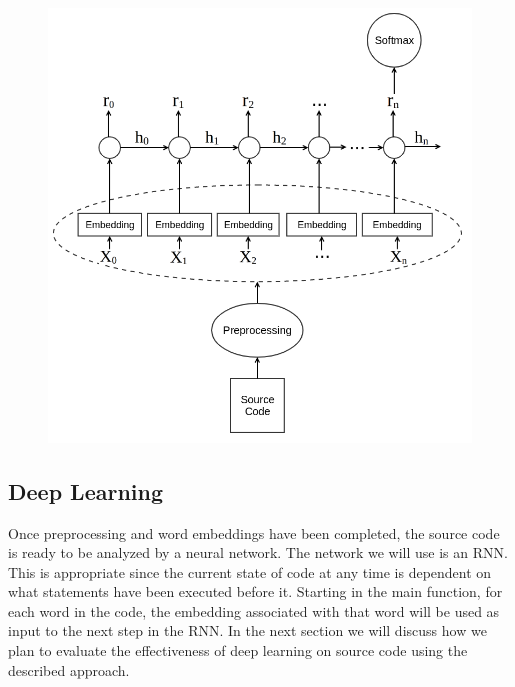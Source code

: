 \begin{figure}
   \includegraphics[scale=.32]{figures/deeplearningflow.png}
\end{figure}

\subsection{Deep Learning}

Once preprocessing and word embeddings have been completed, the source code is ready to be analyzed by a neural network. The network we will use is an RNN. This is appropriate since the current state of code at any time is dependent on what statements have been executed before it. Starting in the main function, for each word in the code, the embedding associated with that word will be used as input to the next step in the RNN. In the next section we will discuss how we plan to evaluate the effectiveness of deep learning on source code using the described approach.




